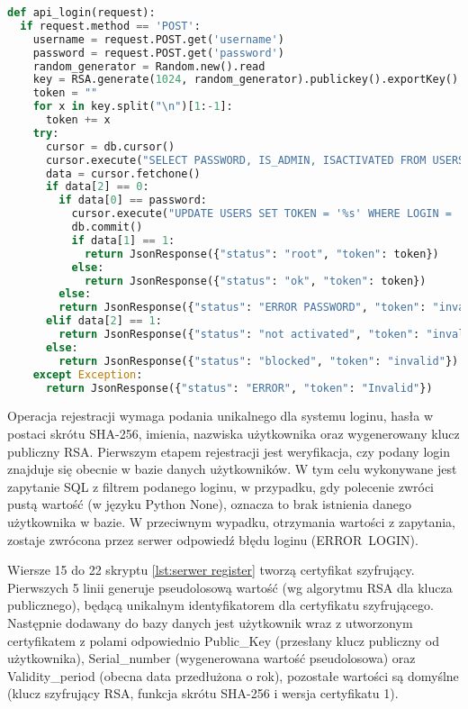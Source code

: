 {\footnotesize 
\begin{lstlisting}[caption={API logowania}, label={lst:serwer login}, language=Python]	
def api_login(request):
  if request.method == 'POST':
    username = request.POST.get('username')
    password = request.POST.get('password')
    random_generator = Random.new().read
    key = RSA.generate(1024, random_generator).publickey().exportKey()
    token = ""
    for x in key.split("\n")[1:-1]:
      token += x
    try:
      cursor = db.cursor()
      cursor.execute("SELECT PASSWORD, IS_ADMIN, ISACTIVATED FROM USERS WHERE login='%s'" % username)
      data = cursor.fetchone()
      if data[2] == 0:
        if data[0] == password:
          cursor.execute("UPDATE USERS SET TOKEN = '%s' WHERE LOGIN = '%s'" % (token, username))
          db.commit()
          if data[1] == 1:
            return JsonResponse({"status": "root", "token": token})
          else:
            return JsonResponse({"status": "ok", "token": token})
        else:
        return JsonResponse({"status": "ERROR PASSWORD", "token": "invalid"})
      elif data[2] == 1:
        return JsonResponse({"status": "not activated", "token": "invalid"})
      else:
        return JsonResponse({"status": "blocked", "token": "invalid"})
    except Exception:
      return JsonResponse({"status": "ERROR", "token": "Invalid"})
\end{lstlisting}}
\newpage
Operacja rejestracji wymaga podania unikalnego dla systemu loginu, hasła w postaci skrótu SHA-256, imienia, nazwiska użytkownika oraz wygenerowany klucz publiczny RSA. Pierwszym etapem rejestracji jest weryfikacja, czy podany login znajduje się obecnie w bazie danych użytkowników. W tym celu wykonywane jest zapytanie SQL z filtrem podanego loginu, w przypadku, gdy polecenie zwróci pustą wartość (w języku Python None), oznacza to brak istnienia danego użytkownika w bazie. W przeciwnym wypadku, otrzymania wartości z zapytania, zostaje zwrócona przez serwer odpowiedź błędu loginu (ERROR~LOGIN).

Wiersze 15 do 22 skryptu \ref{lst:serwer register} tworzą certyfikat szyfrujący. Pierwszych 5 linii generuje pseudolosową wartość (wg algorytmu RSA dla klucza publicznego), będącą unikalnym identyfikatorem dla certyfikatu szyfrującego. Następnie dodawany do bazy danych jest użytkownik wraz z utworzonym certyfikatem z polami odpowiednio Public\_Key (przesłany klucz publiczny od użytkownika), Serial\_number (wygenerowana wartość pseudolosowa) oraz Validity\_period (obecna data przedłużona o rok), pozostałe wartości są domyślne (klucz szyfrujący RSA, funkcja skrótu SHA-256 i wersja certyfikatu 1).

